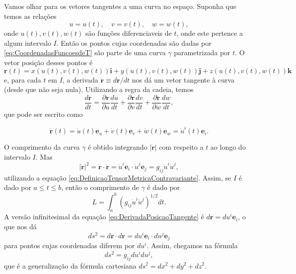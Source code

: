 Vamos olhar para os vetores tangentes a uma curva no espaço.
Suponha que temos as relações
\begin{equation}\label{eq:CoordenadasFuncoesdeT}
	u=u(t), \quad v=v(t), \quad w=w(t) ,
\end{equation}
onde $u(t),v(t),w(t)$ são funções diferenciaveis de $t$, onde este pertence a algum intervalo $I$. Então os pontos cujas coordenadas são dadas por \eqref{eq:CoordenadasFuncoesdeT} são parte de uma curva $\gamma$ parametrizada por $t$. O vetor posição desses pontos é 
\[
	\mathbf{r}(t)=x(u(t), v(t), w(t)) \mathbf{i}+y(u(t), v(t), w(t)) \mathbf{j}+z(u(t), v(t), w(t)) \mathbf{k}	
\]
e, para cada $t$ em $I$, a derivada $\dot{\mathbf{r}} \equiv d\mathbf{r}/dt$ nos dá um vetor tangente à curva (desde que não seja nula). Utilizando a regra da cadeia, temos
\[
	\frac{d \mathbf{r}}{d t}=\frac{\partial \mathbf{r}}{\partial u} \frac{d u}{d t}+\frac{\partial \mathbf{r}}{\partial v} \frac{d v}{d t}+\frac{\partial \mathbf{r}}{\partial w} \frac{d w}{d t} ,
\]
que pode ser escrito como

\begin{equation}\label{eq:DerivadaPosicaoTangente}
	\dot{\mathbf{r}}(t)=\dot{u}(t)\mathbf{e}_u+\dot{v}(t)\mathbf{e}_v+\dot{w}(t)\mathbf{e}_w = \dot{u}^i(t)\mathbf{e}_i.
\end{equation}

O comprimento da curva $\gamma$ é obtido integrando $|\dot{\mathbf{r}}|$ com respeito a $t$ ao longo do intervalo $I$. Mas
\[
	|\dot{\mathbf{r}}|^{2}=\dot{\mathbf{r}} \cdot \dot{\mathbf{r}}=\dot{u}^{i} \mathbf{e}_{i} \cdot \dot{u}^{j} \mathbf{e}_{j}=g_{i j} \dot{u}^{i} \dot{u}^{j},
\]
utilizando a equação \eqref{eq:DefinicaoTensorMetricaContravariante}. Assim, se $I$ é dado por $a\leq t\leq b$, então o comprimento de $\gamma$ é dado por
\begin{equation}\label{eq:ComprimentoCurva}
	\boxed{
	L=\int_{a}^{b}\left(g_{i j} \dot{u}^{i} \dot{u}^{j}\right)^{1 / 2} dt .
	}
\end{equation}
A versão infinitesimal da equação \eqref{eq:DerivadaPosicaoTangente} é $d\mathbf{r}=du^i\mathbf{e}_i$, o que nos dá
\[
	ds^2=d\mathbf{r}\cdot d\mathbf{r}=du^i\mathbf{e}_i \cdot du^j\mathbf{e}_j 
\]
para pontos cujas coordenadas diferem por $du^i$. Assim, chegamos na fórmula 
\begin{equation}
	\boxed{
		ds^2=g_{ij}du^i du^j,
	}
\end{equation}
que é a generalização da fórmula cartesiana $ds^2=dx^2+dy^2+dz^2$.

